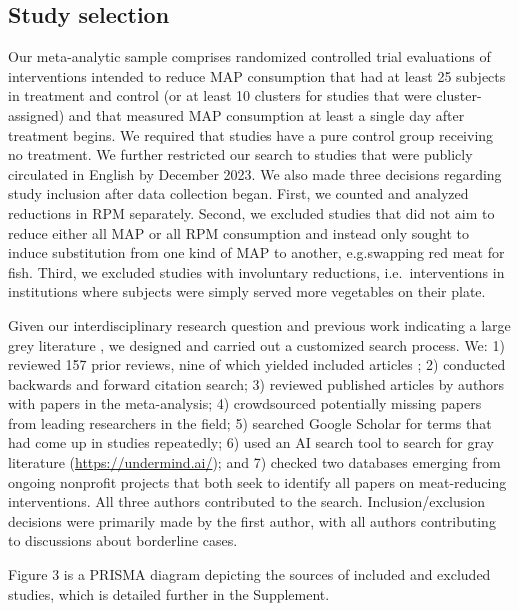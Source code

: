 \documentclass[sn-nature,referee,pdflatex]{sn-jnl}
\begin{document}
\subsection{Study selection}\label{sec3.1}

Our meta-analytic sample comprises randomized controlled trial
evaluations of interventions intended to reduce MAP consumption that had
at least 25 subjects in treatment and control (or at least 10 clusters
for studies that were cluster-assigned) and that measured MAP
consumption at least a single day after treatment begins. We required
that studies have a pure control group receiving no treatment. We
further restricted our search to studies that were publicly circulated
in English by December 2023. We also made three decisions regarding
study inclusion after data collection began. First, we counted and
analyzed reductions in RPM separately. Second, we excluded studies that
did not aim to reduce either all MAP or all RPM consumption and instead
only sought to induce substitution from one kind of MAP to another,
e.g.swapping red meat for fish. Third, we excluded studies with
involuntary reductions, i.e.~interventions in institutions where
subjects were simply served more vegetables on their plate.

Given our interdisciplinary research question and previous work
indicating a large grey literature \citep{mathur2021meta}, we designed
and carried out a customized search process. We: 1) reviewed 157 prior
reviews, nine of which yielded included articles
\citep{mathur2021meta, bianchi2018conscious, bianchi2018restructuring, ammann2023, chang2023, DiGennaro2024, harguess2020, ronto2022, wynes2018};
2) conducted backwards and forward citation search; 3) reviewed
published articles by authors with papers in the meta-analysis; 4)
crowdsourced potentially missing papers from leading researchers in the
field; 5) searched Google Scholar for terms that had come up in studies
repeatedly; 6) used an AI search tool to search for gray literature
(\url{https://undermind.ai/}); and 7) checked two databases emerging
from ongoing nonprofit projects that both seek to identify all papers on
meat-reducing interventions. All three authors contributed to the
search. Inclusion/exclusion decisions were primarily made by the first
author, with all authors contributing to discussions about borderline
cases.

Figure 3 is a PRISMA diagram depicting the sources of included and
excluded studies, which is detailed further in the Supplement.
\end{document}
